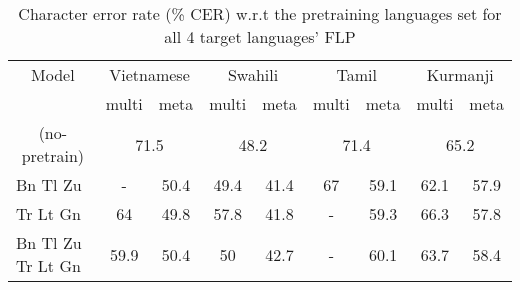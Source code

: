\begin{table*}[ht!]
\centering
\caption{Character error rate (\si{\percent} CER) w.r.t the pretraining languages set for all 4 target languages' FLP}
\label{tab:flp-beam-table}
\begin{tabular}{@{}ccccccccc@{}}
\toprule
Model                                    & \multicolumn{2}{c}{Vietnamese}                         & \multicolumn{2}{c}{Swahili}                        & \multicolumn{2}{c}{Tamil}                        & \multicolumn{2}{c}{Kurmanji} \\

                                         & multi           & meta                                & multi           & meta                                & multi           & meta                                & multi           & meta           \\ \midrule
\multicolumn{1}{c|}{(no-pretrain)}                   & \multicolumn{2}{c|}{71.5}                    & \multicolumn{2}{c|}{48.2}                    & \multicolumn{2}{c|}{71.4}          & \multicolumn{2}{c}{65.2}                    \\

\multicolumn{1}{l|}{Bn Tl Zu}   &    -      & \multicolumn{1}{c|}{50.4}          & 49.4          & \multicolumn{1}{c|}{41.4}          & 67          & \multicolumn{1}{c|}{59.1}          & 62.1          & 57.9          \\
\multicolumn{1}{l|}{ \qquad \qquad Tr Lt Gn} & 64          & \multicolumn{1}{c|}{49.8}          & 57.8          & \multicolumn{1}{c|}{41.8}          & -          & \multicolumn{1}{c|}{59.3}          & 66.3          & 57.8          \\
\multicolumn{1}{l|}{Bn Tl Zu Tr Lt Gn}           & 59.9          & \multicolumn{1}{c|}{50.4}          & 50          & \multicolumn{1}{c|}{42.7}          & -          & \multicolumn{1}{c|}{60.1}          & 63.7          & 58.4          \\ \bottomrule
\end{tabular}
\end{table*}

